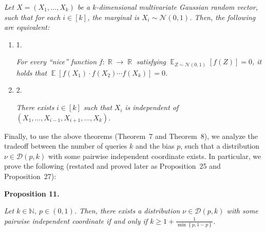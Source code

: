 \emph{Let $X=(X_{1},\dots,X_{k})$ be a $k$-dimensional multivariate Gaussian random vector, such that for each $i\in[k]$, the marginal is $X_{i}\sim\mathcal{N}(0,1)$.
Then, the following are equivalent:}\par


\begin{enumerate}


\item[] 
1. 


\emph{For every “nice” function }$f:\mathop{\mathbb{R}}\to\mathop{\mathbb{R}}$\emph{ satisfying }$\mathop{\mathbb{E}}_{Z\sim\mathcal{N}(0,1)}\left[f(Z)\right]=0$\emph{, it holds that }$\mathop{\mathbb{E}}\left[f(X_{1})\cdot f(X_{2})\cdots f(X_{k})\right]=0$\emph{.}\par





\item[] 
2. 


\emph{There exists }$i\in[k]$\emph{ such that }$X_{i}$\emph{ is independent of }$(X_{1},\dots,X_{i-1},X_{i+1},\dots,X_{k})$\emph{.}\par





\end{enumerate}






Finally, to use the above theorems (Theorem 7 and Theorem 8), we analyze the tradeoff between the number of queries $k$ and the bias $p$, such that a distribution $\nu\in\mathcal{D}(p,k)$ with some pairwise independent coordinate exists.
In particular, we prove the following (restated and proved later as Proposition 25 and Proposition 27):\par





\par\medskip\noindent\textbf{
\textbf{Proposition 11}\textbf{.}
}\par



\emph{Let $k\in\mathbb{N},\ p\in(0,1)$.
Then, there exists a distribution $\nu\in\mathcal{D}(p,k)$ with some pairwise independent coordinate if and only if $k\geqslant 1+\frac{1}{\min\left\{p,1-p\right\}}$.}\par



